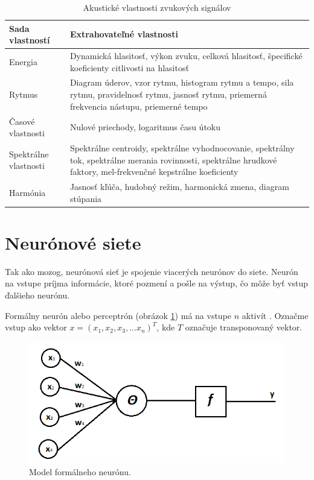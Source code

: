 \begin{table}[]
\centering
\caption{Akustické vlastnosti zvukových signálov}
\label{features_table}
\begin{tabular}{l p{10cm}}
\hline
\textbf{Sada vlastností} & \textbf{Extrahovateľné vlastnosti}                                                                                                                                                                             \\ \hline
Energia                  & Dynamická hlasitosť, výkon zvuku, celková hlasitosť, špecifické koeficienty citlivosti na hlasitosť                                                                  \\
Rytmus                   & Diagram úderov, vzor rytmu, histogram rytmu a tempo, sila rytmu, pravidelnosť rytmu, jasnosť rytmu, priemerná frekvencia nástupu, priemerné tempo                  \\
Časové vlastnosti        & Nulové priechody, logaritmus času útoku                                                                                                                                                                        \\
Spektrálne vlastnosti    & Spektrálne centroidy, spektrálne vyhodnocovanie, spektrálny tok, spektrálne merania rovinnosti, spektrálne hrudkové faktory, mel-frekvenčné kepstrálne koeficienty \\
Harmónia                 & Jasnosť kľúča, hudobný režim, harmonická zmena, diagram stúpania                                                                                                     \\ \hline
\end{tabular}
\end{table}

\section{Neurónové siete}
Tak ako mozog, neurónová sieť je spojenie viacerých neurónov do siete.
Neurón na vstupe príjma informácie, ktoré pozmení a pošle na výstup, čo môže byť vstup ďalšieho neurónu.

Formálny neurón alebo perceptrón (obrázok \ref{formal_neuron}) má na vstupe \(n\) aktivít \cite{NNKvasnicka}.
Označme vstup ako vektor \(x = (x_1, x_2, x_3, ... x_n)^T\), kde \(T\) označuje transponovaný vektor.

\begin{figure}[!ht] 
	\centering 
	\includegraphics[width=.6\textwidth]{figures/perceptron} 
	\caption{Model formálneho neurónu.} 
	\label{formal_neuron}
\end{figure}


